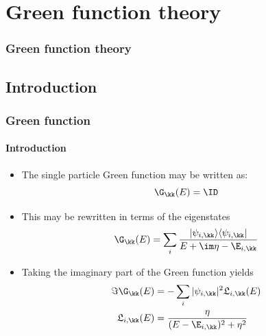 \section{Green function theory}

\begin{framenologo}
  \frametitle{Green function theory}
  \tableofcontents[currentsection]
\end{framenologo}

\subsection{Introduction}

\begin{frame}
  \frametitle{Green function}
  \framesubtitle{Introduction}

  \begin{itemize}[<+->]
    \item %
    The single particle Green function may be written as:
    \begin{equation*}
      [(E+\im\eta)\ID - \HH_\kk]\G_\kk(E) = \ID
    \end{equation*}

    \item%
    This may be rewritten in terms of the eigenstates
    \begin{equation*}
      \G_\kk(E) = \sum_i \frac{|\psi_{i,\kk}\rangle\langle \psi_{i,\kk}|}{E+\im\eta-\E_{i,\kk}}
    \end{equation*}

    \item%
    Taking the imaginary part of the Green function yields
    \begin{align*}
      \Im \G_\kk(E) &= -\sum_i |\psi_{i,\kk}|^2\mathfrak{L}_{i,\kk}(E)
      \\
      \mathfrak{L}_{i,\kk}(E) &= \frac{\eta}{(E-\E_{i,\kk})^2 + \eta^2}
    \end{align*}

  \end{itemize}

\end{frame}


